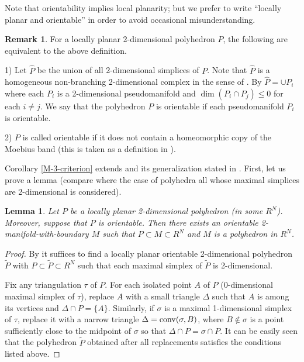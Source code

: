 \documentclass[12pt]{article}
\newtheorem{lemma}[theorem]{Lemma}
\theoremstyle{definition}
\newtheorem{remark}[theorem]{Remark}
\begin{document}
Note that orientability implies 
local planarity;
but we prefer 
to write ``locally planar and orientable''
in order 
to avoid occasional 
misunderstanding.

\begin{remark}\label{or}
For a locally planar 2-dimensional polyhedron $P$,
the following are
equivalent to the above definition.

1) Let $\hat P$ be the union of all 2-dimensional simplices of $P$. Note that 
$\hat P$ is a 
homogeneous 
non-branching
2-dimensional complex
in the sense of
\cite[p.314, p.462]{Rinow}.
By \cite[43.24]{Rinow}
$\hat P = \cup P_i$
where each $P_i$
is a 2-dimensional pseudomanifold
and $\dim (P_i \cap P_j) \leqslant 0$
for each $i\neq j$.
We say that the polyhedron $P$ is orientable
if each pseudomanifold $P_i$
is orientable.

2) $P$ is called orientable
if it does not contain a 
homeomorphic copy of the Moebius band
(this is taken as a definition in \cite{Bothe-review}).
\end{remark}


Corollary \ref{M-3-criterion}
extends
\cite[Thm. 3]{GP}
and its generalization
stated in \cite{Bothe-review}.
First, let us prove a lemma
(compare
\cite[p.~167, Lemma]{GP}
where the case of 
polyhedra all whose maximal simplices
are 2-dimensional is considered).


\begin{lemma}\label{surfaces}
Let $P$ be a locally planar
2-dimensional polyhedron
(in some $R^N$).
Moreover, suppose that
$P$ is orientable.
Then there exists an orientable 2-manifold-with-boundary $M$ such that $P\subset M\subset R^N$
and $M$ is a polyhedron in $R^N$.
\end{lemma}

\begin{proof}
By \cite[p.167--168, Lemma]{GP}
it suffices 
to find 
a locally planar orientable
2-dimensional polyhedron $\tilde P$
with
$P\subset \tilde P\subset R^N$
such that
each maximal simplex of $\tilde P$
is 2-dimensional.

Fix any triangulation $\tau $ of $P$.
For
each isolated point $A$ of $P$
(0-dimensional maximal simplex of $\tau $), 
replace $A$ with a small triangle
$\Delta $ such that
$A$ is among its vertices
and
$\Delta \cap P = \{ A\} $.
Similarly, if $\sigma $ 
is a maximal 1-dimensional simplex of $\tau $,
replace it with a narrow triangle
$\Delta = \operatorname{conv} (\sigma , B)$,
where $B\notin \sigma $ is a point sufficiently
close to the midpoint of $\sigma $ so that
$\Delta \cap P = \sigma \cap P$.
It can be easily seen that the polyhedron
$\tilde P$
obtained after all replacements 
satisfies the conditions listed above.
\end{proof}
\end{document}
